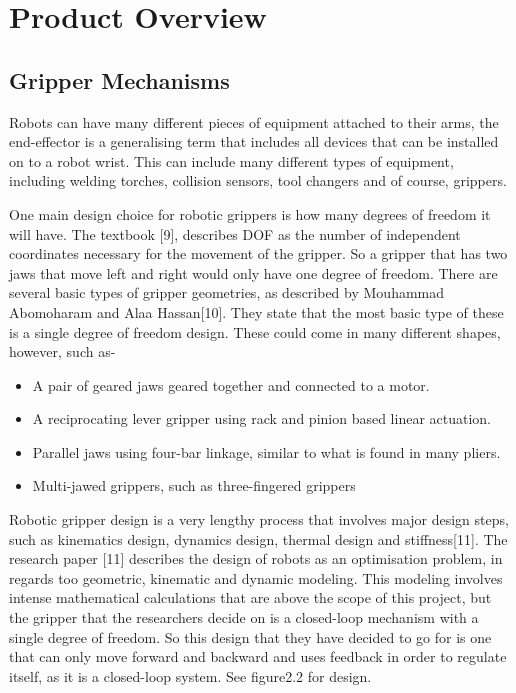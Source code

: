 \documentclass{l4proj}
\begin{document}
\section{Product Overview}

\subsection{Gripper Mechanisms}
Robots can have many different pieces of equipment attached to their arms, the end-effector is a generalising term that includes all devices that can be installed on to a robot wrist. This can include many different types of equipment, including welding torches, collision sensors, tool changers and of course, grippers. 

One main design choice for robotic grippers is how many degrees of freedom it will have. The textbook [9], describes DOF as the number of independent coordinates necessary for the movement of the gripper. So a gripper that has two jaws that move left and right would only have one degree of freedom. There are several basic types of gripper geometries, as described by Mouhammad Abomoharam and Alaa Hassan[10]. They state that the most basic type of these is a single degree of freedom design. These could come in many different shapes, however, such as-
\begin{itemize}
	\item
	A pair of geared jaws geared together and connected to a motor.
	\item
	A reciprocating lever gripper using rack and pinion based linear actuation. 
	\item
	Parallel jaws using four-bar linkage, similar to what is found in many pliers.
	\item 
	Multi-jawed grippers, such as three-fingered grippers 
\end{itemize}

Robotic gripper design is a very lengthy process that involves major design steps, such as kinematics design, dynamics design, thermal design and stiffness[11]. The research paper [11] describes the design of robots as an optimisation problem, in regards too geometric, kinematic and dynamic modeling. This modeling involves intense mathematical calculations that are above the scope of this project, but the gripper that the researchers decide on is a closed-loop mechanism with a single degree of freedom. So this design that they have decided to go for is one that can only move forward and backward and uses feedback in order to regulate itself, as it is a closed-loop system. See figure2.2 for design.
\end{document}
